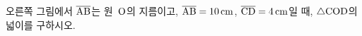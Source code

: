 \noindent\begin{minipage}[t]{0.58\linewidth}\vspace{0pt}\raggedright 오른쪽 그림에서 $\overline{\mathrm{AB}}$는 원~$\mathrm{O}$의 지름이고, $\overline{\mathrm{AB}}=10\,\mathrm{cm}$, $\overline{\mathrm{CD}}=4\,\mathrm{cm}$일 때, $\triangle\mathrm{COD}$의 넓이를 구하시오.\end{minipage}\hfill\begin{minipage}[t]{0.4\linewidth}\vspace{0pt}\centering \resizebox{\ifdim\width>\linewidth\linewidth\else\width\fi}{!}{}\end{minipage}\par
